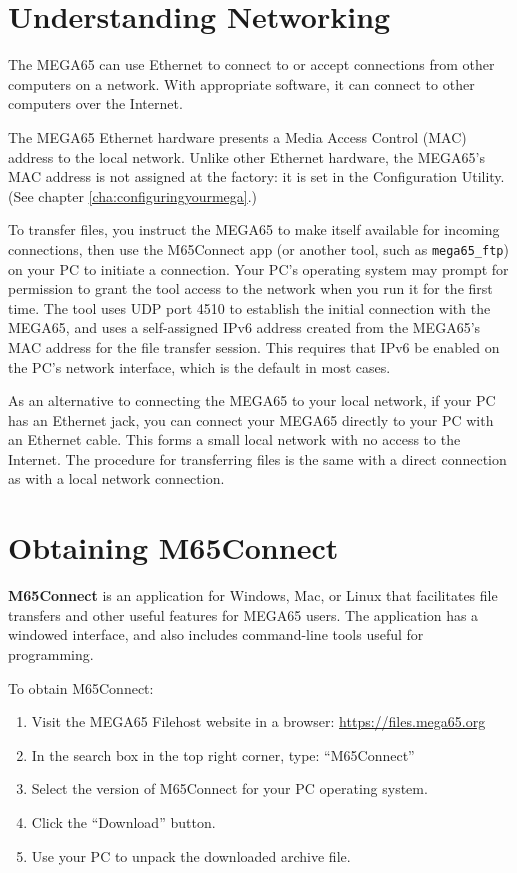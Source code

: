 \section{Understanding Networking}

The MEGA65 can use Ethernet to connect to or accept connections from other computers on a network. With appropriate software, it can connect to other computers over the Internet.

The MEGA65 Ethernet hardware presents a Media Access Control (MAC) address to the local network. Unlike other Ethernet hardware, the MEGA65's MAC address is not assigned at the factory: it is set in the Configuration Utility. (See chapter \vref{cha:configuringyourmega}.)

To transfer files, you instruct the MEGA65 to make itself available for incoming connections, then use the M65Connect app (or another tool, such as \texttt{mega65\_ftp}) on your PC to initiate a connection. Your PC's operating system may prompt for permission to grant the tool access to the network when you run it for the first time. The tool uses UDP port 4510 to establish the initial connection with the MEGA65, and uses a self-assigned IPv6 address created from the MEGA65's MAC address for the file transfer session. This requires that IPv6 be enabled on the PC's network interface, which is the default in most cases.

As an alternative to connecting the MEGA65 to your local network, if your PC has an Ethernet jack, you can connect your MEGA65 directly to your PC with an Ethernet cable. This forms a small local network with no access to the Internet. The procedure for transferring files is the same with a direct connection as with a local network connection.

\section{Obtaining M65Connect}

{\bf M65Connect} is an application for Windows, Mac, or Linux that facilitates file transfers and other useful features for MEGA65 users. The application has a windowed interface, and also includes command-line tools useful for programming.

To obtain M65Connect:

\begin{enumerate}
\item Visit the MEGA65 Filehost website in a browser: \url{https://files.mega65.org}
\item In the search box in the top right corner, type: ``M65Connect''
\item Select the version of M65Connect for your PC operating system.
\item Click the ``Download'' button.
\item Use your PC to unpack the downloaded archive file.
\end{enumerate}

